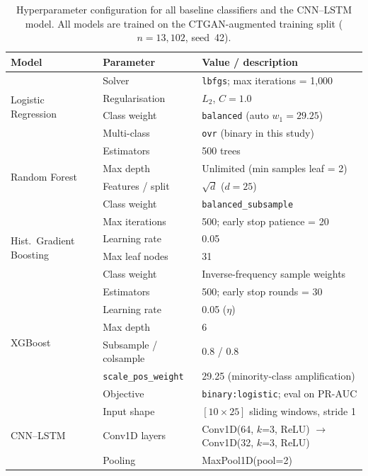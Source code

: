 \documentclass[sensors,article,submit,pdftex,moreauthors]{Definitions/mdpi}
\newcommand{\mdpitablefont}{\footnotesize}
\begin{document}
\begin{table}[H]
\caption{Hyperparameter configuration for all baseline classifiers and the CNN--LSTM model.
All models are trained on the CTGAN-augmented training split ($n = 13{,}102$, seed~42).
\label{tab:baselines}}
\centering
\mdpitablefont
\begin{tabularx}{\textwidth}{llX}
\toprule
\textbf{Model} & \textbf{Parameter} & \textbf{Value / description} \\
\midrule
\multirow{4}{*}{Logistic Regression}
  & Solver          & \texttt{lbfgs}; max iterations = 1{,}000 \\
  & Regularisation  & $L_2$, $C = 1.0$ \\
  & Class weight    & \texttt{balanced} (auto $w_1 = 29.25$) \\
  & Multi-class     & \texttt{ovr} (binary in this study) \\
\midrule
\multirow{4}{*}{Random Forest}
  & Estimators      & 500 trees \\
  & Max depth       & Unlimited (min samples leaf = 2) \\
  & Features / split & $\sqrt{d}$ ($d = 25$) \\
  & Class weight    & \texttt{balanced\_subsample} \\
\midrule
\multirow{4}{*}{Hist.\ Gradient Boosting}
  & Max iterations  & 500; early stop patience = 20 \\
  & Learning rate   & 0.05 \\
  & Max leaf nodes  & 31 \\
  & Class weight    & Inverse-frequency sample weights \\
\midrule
\multirow{6}{*}{XGBoost}
  & Estimators      & 500; early stop rounds = 30 \\
  & Learning rate   & 0.05 ($\eta$) \\
  & Max depth       & 6 \\
  & Subsample / colsample & 0.8 / 0.8 \\
  & \texttt{scale\_pos\_weight} & 29.25 (minority-class amplification) \\
  & Objective       & \texttt{binary:logistic}; eval on PR-AUC \\
\midrule
\multirow{9}{*}{CNN--LSTM}
  & Input shape     & $[10 \times 25]$ sliding windows, stride 1 \\
  & Conv1D layers   & Conv1D(64, $k$=3, ReLU) $\to$ Conv1D(32, $k$=3, ReLU) \\
  & Pooling         & MaxPool1D(pool=2) \\

\end{tabularx}
\end{table}
\end{document}
